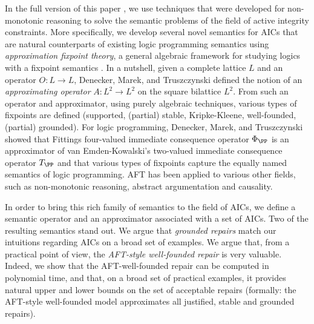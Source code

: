 \documentclass[runningheads]{llncs}
\begin{document}
In the full version of this paper , we use techniques that were developed for non-monotonic reasoning to solve the semantic problems of the field of active integrity constraints. 
More specifically, we develop several novel semantics for AICs that are natural counterparts of existing logic programming semantics using \emph{approximation fixpoint theory}, a general algebraic framework for studying logics with a fixpoint semantics \cite{DeneckerMT00}.
In a nutshell, given a complete lattice $L$ and an operator $O:L\to L$, Denecker, Marek, and Truszczynski \cite{DeneckerMT00} defined the notion of an \emph{approximating operator} $A: L^2\to L^2$ on the square bilattice $L^2$. 
From such an operator and approximator, using purely algebraic techniques, various types of fixpoints are defined (supported, (partial) stable, Kripke-Kleene, well-founded, (partial) grounded). 
For logic programming, Denecker, Marek, and Truszczynski showed that Fittings four-valued immediate consequence operator $\Phi_\PP$ is an approximator of van Emden-Kowalski's two-valued immediate consequence operator $T_\PP$ and that various types of fixpoints capture the equally named semantics of logic programming.
AFT has been applied to various other fields, such as non-monotonic reasoning, abstract argumentation and causality. 

In order to bring this rich family of semantics to the field of AICs, we define a semantic operator and an approximator associated with a set of AICs. Two of the resulting semantics stand out.
We argue that \emph{grounded repairs} match our intuitions regarding AICs on a broad set of examples. 
We argue that, from a practical point of view, the \emph{AFT-style well-founded repair} is very valuable. 
Indeed, we show that the AFT-well-founded repair can be computed in polynomial time, and that, on a broad set of practical examples, it provides natural upper and lower bounds on the set of acceptable repairs (formally: the AFT-style well-founded model approximates all justified, stable and grounded repairs).
\end{document}
